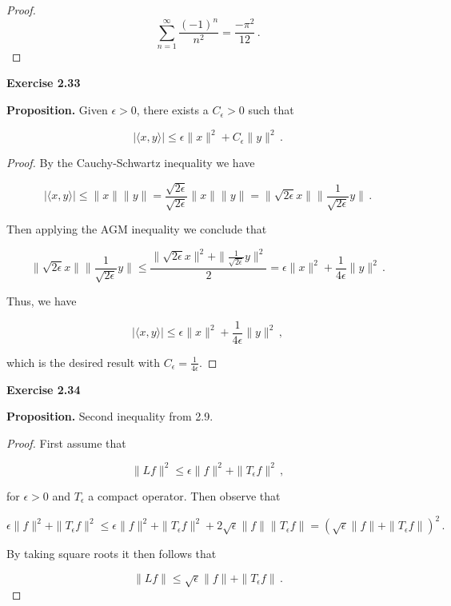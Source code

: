\documentclass[a4paper]{article}
\numberwithin{equation}{section}
\begin{document}
\begin{description}
\begin{proof}
$$\sum_{n=1}^\infty\frac{(-1)^n}{n^2} = \frac{-\pi^2}{12}\,.$$

\end{proof}

\item \textbf{Exercise 2.33}

\item \textbf{Proposition.} Given $\epsilon >0$, there exists a $C_\epsilon > 0$ such that

$$|\langle x,y \rangle| \leq \epsilon \|x\|^2 + C_\epsilon\|y\|^2\,.$$

\item \begin{proof} By the Cauchy-Schwartz inequality we have

$$|\langle x,y \rangle| \leq \|x\|\|y\| = \frac{\sqrt{2\epsilon}}{\sqrt{2\epsilon}}\|x\|\|y\| = \|\sqrt{2\epsilon}x\|\|\frac{1}{\sqrt{2\epsilon}}y\|\,.$$

Then applying the AGM inequality we conclude that

$$\|\sqrt{2\epsilon}x\|\|\frac{1}{\sqrt{2\epsilon}}y\| \leq \frac{\|\sqrt{2\epsilon}x\|^2+\|\frac{1}{\sqrt{2\epsilon}}y\|^2}{2} = \epsilon\|x\|^2+\frac{1}{4\epsilon}\|y\|^2\,.$$

Thus, we have

$$|\langle x,y \rangle| \leq \epsilon\|x\|^2+\frac{1}{4\epsilon}\|y\|^2\,,$$

which is the desired result with $C_\epsilon = \frac{1}{4\epsilon}$.

\end{proof}

\item \textbf{Exercise 2.34}

\item \textbf{Proposition.} Second inequality from 2.9.

\item \begin{proof} First assume that 

$$\|Lf\|^2 \leq \epsilon\|f\|^2 + \|T_\epsilon f\|^2\,,$$

for $\epsilon >0$ and $T_\epsilon$ a compact operator. Then observe that

$$\epsilon\|f\|^2 + \|T_\epsilon f\|^2 \leq \epsilon\|f\|^2 + \|T_\epsilon f\|^2 + 2\sqrt{\epsilon}\|f\|\|T_\epsilon f \| = \left(\sqrt{\epsilon}\|f\| + \|T_\epsilon f\|\right)^2\,.$$

By taking square roots it then follows that

$$\|Lf\| \leq \sqrt{\epsilon}\|f\| + \|T_\epsilon f\|\,.$$


\end{proof}
\end{description}
\end{document}
